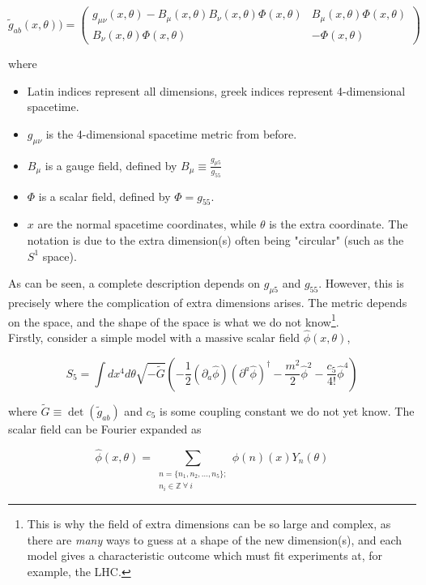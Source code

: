 \documentclass[11pt,a4paper]{article}
\begin{document}
\begin{equation}
	\tilde{g}_{ab}(x,\theta) ) = 
	\begin{pmatrix}
		g_{\mu\nu}(x,\theta)-B_\mu(x,\theta) B_\nu(x,\theta) \Phi(x,\theta) & B_\mu(x,\theta)\Phi(x,\theta)\\
		B_\nu(x,\theta)\Phi(x,\theta) & -\Phi(x,\theta)
	\end{pmatrix}
\end{equation}

where
\begin{itemize}
	\item Latin indices represent all dimensions, greek indices represent 4-dimensional spacetime.
	\item $g_{\mu\nu}$ is the 4-dimensional spacetime metric from before.
	\item $B_\mu$ is a gauge field, defined by $B_\mu \equiv \frac{g_{\mu5}}{g_{55}}$
	\item $\Phi$ is a scalar field, defined by $\Phi = g_{55}$.
	\item $x$ are the normal spacetime coordinates, while $\theta$ is the extra coordinate. The notation is due to the extra dimension(s) often being "circular" (such as the $S^1$ space).
\end{itemize}

As can be seen, a complete description depends on $g_{\mu5}$ and $g_{55}$. However, this is precisely where the complication of extra dimensions arises. The metric depends on the space, and the shape of the space is what we do not know\footnote{This is why the field of extra dimensions can be so large and complex, as there are \emph{many} ways to guess at a shape of the new dimension(s), and each model gives a characteristic outcome which must fit experiments at, for example, the LHC.}. \\
Firstly, consider a simple model with a massive scalar field $\hat{\phi}(x,\theta)$,

\begin{equation}
	S_5 = \int dx^4 d\theta \sqrt{-\tilde{G}}\left(-\frac{1}{2}(\partial_ a\hat{\phi})(\partial^a\hat{\phi})^\dagger - \frac{m^2}{2}\hat{\phi}^2 - \frac{c_5}{4!}\hat{\phi}^4\right)
	\label{eq:KKaction}
\end{equation}

where $\tilde{G} \equiv \det(\tilde{g}_{ab})$ and $c_5$ is some coupling constant we do not yet know. The scalar field can be Fourier expanded as

\begin{equation}
	\hat{\phi}(x,\theta) = \sum_{\substack{n=\{n_1,n_2,\ldots,n_5\}; \\ n_i\in\mathbb{Z}\:\forall\:i}} \phi{(n)}(x)Y_n(\theta)
\end{equation}
\end{document}
